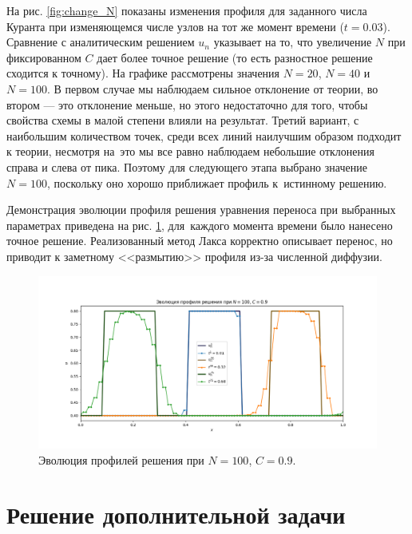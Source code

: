 \documentclass[12pt,a4paper]{article}
\begin{document}
	На рис. \ref{fig:change_N} показаны изменения профиля для заданного числа Куранта при изменяющемся числе узлов на тот же момент времени ($t = 0.03$). Сравнение с аналитическим решением $u_n$ указывает на то, что увеличение $N$ при фиксированном $C$ дает более точное решение (то есть разностное решение сходится к точному). На графике рассмотрены значения $N = 20$, $N = 40$ и $N = 100$. В первом случае мы наблюдаем сильное отклонение от теории, во втором --- это отклонение меньше, но этого недостаточно для того, чтобы свойства схемы в малой степени влияли на результат. Третий вариант, с наибольшим количеством точек, среди всех линий наилучшим образом подходит к теории, несмотря на~это мы все равно наблюдаем небольшие отклонения справа и слева от пика. Поэтому для следующего этапа выбрано значение $N = 100$, поскольку оно хорошо приближает профиль к~истинному решению.
	
	Демонстрация эволюции профиля решения уравнения переноса при выбранных параметрах приведена на рис. \ref{fig:evolution}, для~каждого момента времени было нанесено точное решение. Реализованный метод Лакса корректно описывает перенос, но приводит к заметному <<размытию>> профиля из-за численной диффузии.
	\begin{figure}[!h]
		\centering
		\includegraphics[width=18cm]{figures/Figure_3c.png}
		\caption{Эволюция профилей решения при $N=100$, $C=0.9$.}
		\label{fig:evolution}
	\end{figure}
	
	\section{Решение дополнительной задачи}
\end{document}
